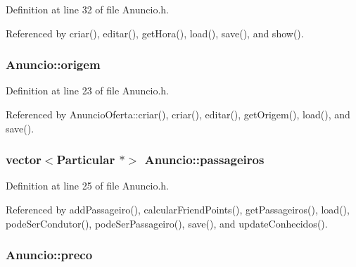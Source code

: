 Definition at line 32 of file Anuncio.\+h.



Referenced by criar(), editar(), get\+Hora(), load(), save(), and show().

\hypertarget{class_anuncio_a9b3f8ac29ebf2a44e24ea2273064a7f5}{
\subsubsection[{origem}]{ Anuncio\+::origem\hspace{0.3cm}{\ttfamily [protected]}}}\label{class_anuncio_a9b3f8ac29ebf2a44e24ea2273064a7f5}


Definition at line 23 of file Anuncio.\+h.



Referenced by Anuncio\+Oferta\+::criar(), criar(), editar(), get\+Origem(), load(), and save().

\hypertarget{class_anuncio_a76cdb1291df7bd8736141304d759ef35}{
\subsubsection[{passageiros}]{\setlength{\rightskip}{0pt plus 5cm}vector$<${\bf Particular} $\ast$$>$ Anuncio\+::passageiros\hspace{0.3cm}{\ttfamily [protected]}}}\label{class_anuncio_a76cdb1291df7bd8736141304d759ef35}


Definition at line 25 of file Anuncio.\+h.



Referenced by add\+Passageiro(), calcular\+Friend\+Points(), get\+Passageiros(), load(), pode\+Ser\+Condutor(), pode\+Ser\+Passageiro(), save(), and update\+Conhecidos().

\hypertarget{class_anuncio_aa780fd8e07586a3af117fd20593fb1b4}{
\subsubsection[{preco}]{ Anuncio\+::preco\hspace{0.3cm}{\ttfamily [protected]}}}\label{class_anuncio_aa780fd8e07586a3af117fd20593fb1b4}


